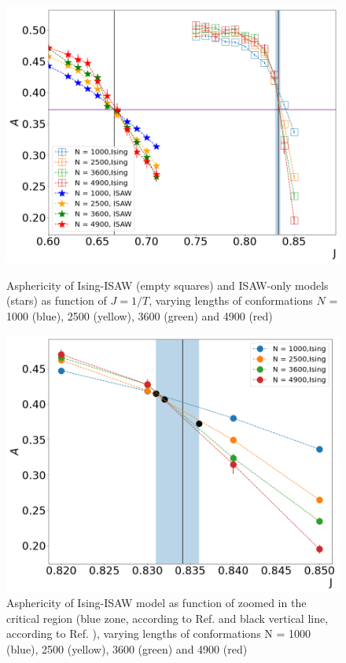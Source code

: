 \documentclass[a4paper]{jpconf}
\begin{document}
\begin{figure}[h!]
    \begin{minipage}{0.48\textwidth}
        \includegraphics[width=\textwidth]{Images/Ising_ISAW_A_J_Full.png}
        \caption{Asphericity of Ising-ISAW (empty squares) and ISAW-only models (stars) as function of $J=1/T$, varying lengths of conformations $N$ = 1000 (blue), 2500 (yellow), 3600 (green) and 4900 (red)}
        \label{fig:Ising&ISAW_A_J}
    \end{minipage}
    \hfill
    \begin{minipage}{0.48\textwidth}
        \includegraphics[width=\textwidth]{Images/Ising_A_J_Close.png}
        \caption{Asphericity of Ising-ISAW model as function of zoomed in the critical region (blue zone, according to Ref. \cite{Foster2021} and black vertical line, according to Ref. \cite{faizullina2021critical}), varying lengths of conformations N = 1000 (blue), 2500 (yellow), 3600 (green) and 4900 (red)}
        \label{fig:Ising_A_J}
    \end{minipage}
\end{figure}
\end{document}

